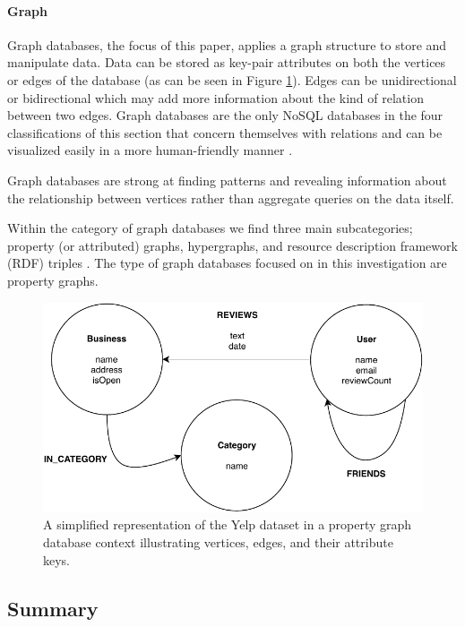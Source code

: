 \paragraph{Graph}

Graph databases, the focus of this paper, applies a graph structure to store and manipulate data. Data can be stored as key-pair attributes on both the vertices or edges of the database (as can be seen in Figure \ref{fig:graph-db}). Edges can be unidirectional or bidirectional which may add more information about the kind of relation between two edges. Graph databases are the only NoSQL databases in the four classifications of this section that concern themselves with relations and can be visualized easily in a more human-friendly manner \cite{nosql-db}.

Graph databases are strong at finding patterns and revealing information about the relationship between vertices rather than aggregate queries on the data itself.

Within the category of graph databases we find three main subcategories; property (or attributed) graphs, hypergraphs, and resource description framework (RDF) triples \cite{socialdata}. The type of graph databases focused on in this investigation are property graphs.

\begin{figure}[h!]
    \centering
    \includegraphics[width=12cm]{img/graph-db.pdf}
    \caption{A simplified representation of the Yelp dataset in a property graph database context illustrating vertices, edges, and their attribute keys.}
    \label{fig:graph-db}
\end{figure}

\subsection{Summary}


